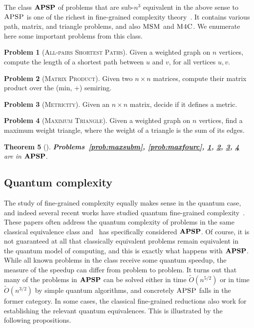 \documentclass[12pt]{article}
\newcommand{\MP}{\textsc{Matrix Product}}
\newcommand{\Met}{\textsc{Metricity}}
\newcommand{\MaxT}{\textsc{Maximum Triangle}}
\newcommand{\MaxSubM}{\textsc{MSM}}
\newcommand{\MaxFourC}{\textsc{M4C}}
\newcommand{\APSPf}{\textsc{All-pairs Shortest Paths}}
\newcommand{\APSPc}{\bf{APSP}}
\newcommand{\APSP}{\textsc{APSP}}
\newtheorem{theorem}{Theorem}
\theoremstyle{definition}
\newtheorem{problem}[theorem]{Problem}
\begin{document}
The class $\APSPc$ of problems that are sub-$n^3$ equivalent in the above sense to $\APSP$ is one of the richest in fine-grained complexity theory~\cite{VW18, Vas19}. It contains various path, matrix, and triangle problems, and also $\MaxSubM$ and $\MaxFourC$.  We enumerate here some important problems from this class.

\begin{problem}[\APSPf]
\label{prob:apsp}
  Given a weighted graph on $n$ vertices, compute the length of a shortest path between $u$ and $v$, for all vertices $u,v$.
\end{problem}

\begin{problem}[\MP]
\label{prob:mp}
  Given two $n \times n$ matrices, compute their matrix product over the (min, +) semiring.
\end{problem}

\begin{problem}[\Met]
\label{prob:met}
  Given an $n \times n$ matrix, decide if it defines a metric.
\end{problem}

\begin{problem}[\MaxT]
\label{prob:maxt}
 Given a weighted graph on $n$ vertices, find a maximum weight triangle, where the weight of a triangle is the sum of its edges.
\end{problem}

\begin{theorem}[\cite{VW18, BDT16}]
{\bf Problems~\ref{prob:maxsubm}, \ref{prob:maxfourc}, \ref{prob:apsp}, \ref{prob:mp}, \ref{prob:met}, \ref{prob:maxt} }
are in $\APSPc$.
\end{theorem}

\subsection{Quantum complexity}
\label{subsec:quantum}

The study of fine-grained complexity equally makes sense in the quantum case, and indeed several recent works have studied quantum fine-grained complexity~\cite{ACLWZ20, BPS21, BLPS22}. These papers often address the quantum complexity of problems in the same classical equivalence class and~\cite{ABLPS22} has specifically considered $\APSPc$. Of course, it is not guaranteed at all that classically equivalent problems remain equivalent in the quantum model of computing, and this is exactly what happens
with $\APSPc$. While all known problems in the class receive some quantum speedup, the measure of the speedup can differ from problem to problem. It turns out that many of the problems in $\APSPc$ can be solved either in time $\widetilde{O}(n^{5/2})$ or in time $\widetilde{O}(n^{3/2})$ by simple quantum algorithms, and concretely $\APSP$ falls in the former category. In some cases, the classical fine-grained reductions also work for establishing the relevant quantum equivalences.
This is illustrated by the following propositions. 
\end{document}

